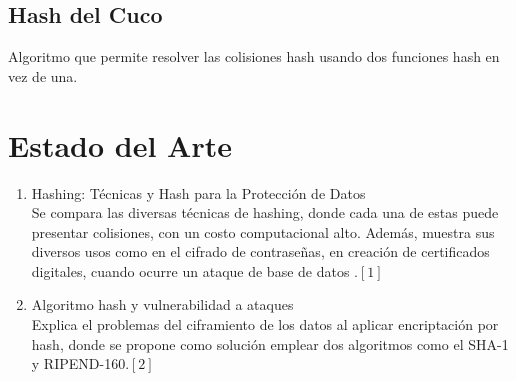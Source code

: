 \documentclass[final,a4paper,twocolumn,romanappendices]{IEEEtran}
\begin{document}
\subsection{Hash del Cuco}
Algoritmo que permite resolver las colisiones hash usando dos funciones hash en vez de una.


\section{Estado del Arte}

\begin{enumerate}

\item
Hashing: Técnicas y Hash para la Protección de Datos \\
Se compara las diversas técnicas de hashing, donde cada una de estas puede presentar colisiones, con un costo computacional alto. Además, muestra sus diversos  usos  como en el cifrado de contraseñas, en creación de certificados digitales, cuando ocurre un ataque de base de datos .$[1]$

\item
Algoritmo hash y vulnerabilidad a ataques\\
Explica el problemas del ciframiento de los datos al aplicar encriptación por hash, donde se propone como solución emplear dos algoritmos como el SHA-1 y RIPEND-160.$[2]$
\end{enumerate}
\end{document}
